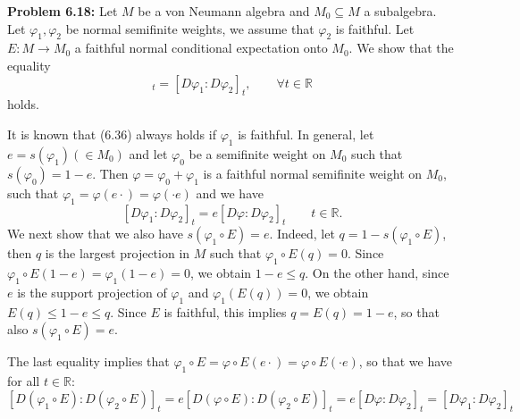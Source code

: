 \documentclass[12pt]{article}
\begin{document}
\noindent
\textbf{Problem 6.18:} Let $M$ be a von Neumann algebra and $M_0\subseteq M$ a subalgebra. Let 
 $\varphi_1,\varphi_2$ be  normal semifinite weights, we assume that  $\varphi_2$ is faithful.
Let $E: M\to M_0$ a faithful normal conditional expectation onto $M_0$.
We show that the equality
\begin{equation}
[D(\varphi_1\circ E):D(\varphi_2\circ E)]_t=[D\varphi_1:D\varphi_2]_t,\qquad \forall t\in \mathbb R\tag{6.36}
\end{equation}
holds. 

It is known that (6.36) always holds if $\varphi_1$ is faithful. In general, let $e=s(\varphi_1)(\in M_0)$ and let 
$\varphi_0$ be a semifinite weight on $M_0$ such that $s(\varphi_0)=1-e$. Then $\varphi=\varphi_0+\varphi_1$
is a faithful normal semifinite weight on $M_0$, such that $\varphi_1=\varphi(e\cdot)=\varphi(\cdot e)$ and we have
\[
[D\varphi_1:D\varphi_2]_t= e[D\varphi:D\varphi_2]_t\qquad t\in \mathbb R.
\]
We next show that we also have $s(\varphi_1\circ E)=e$. Indeed, let $q=1-s(\varphi_1\circ E)$, then $q$ is the largest
projection in $M$ such that $\varphi_1\circ E(q)=0$. Since 
$\varphi_1\circ E(1-e)=\varphi_1(1-e)=0$, we obtain $1-e\le q$. On the other hand, since $e$ is the support projection
of $\varphi_1$ and $\varphi_1(E(q))=0$, we obtain $E(q)\le 1-e\le q$.  Since $E$ is  
faithful, this implies $q=E(q)=1-e$, so that also   $s(\varphi_1\circ E)=e$.

The last equality implies that $\varphi_1\circ E=\varphi\circ E(e\cdot)=\varphi\circ E(\cdot e)$, so that  we have for
all $t\in \mathbb R$:
\[
[D(\varphi_1\circ E):D(\varphi_2\circ E)]_t=e[D(\varphi\circ E):D(\varphi_2\circ
E)]_t=e[D\varphi:D\varphi_2]_t=[D\varphi_1:D\varphi_2]_t
\] 
\end{document}
